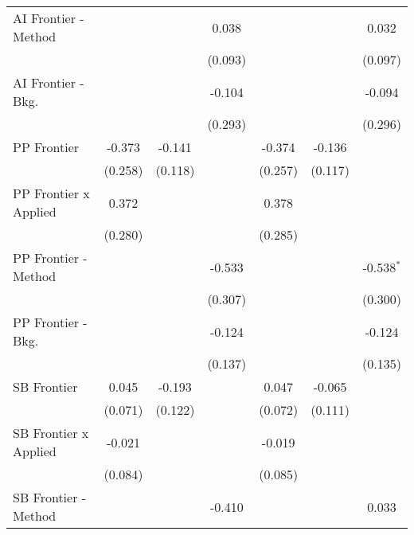\begin{tabular}{lcccccc}
   AI Frontier - Method         &                &         & 0.038         &                &         & 0.032\\   
                                &                &         & (0.093)       &                &         & (0.097)\\   
   AI Frontier - Bkg.           &                &         & -0.104        &                &         & -0.094\\   
                                &                &         & (0.293)       &                &         & (0.296)\\   
   PP Frontier                  & -0.373         & -0.141  &               & -0.374         & -0.136  &   \\   
                                & (0.258)        & (0.118) &               & (0.257)        & (0.117) &   \\   
   PP Frontier x Applied        & 0.372          &         &               & 0.378          &         &   \\   
                                & (0.280)        &         &               & (0.285)        &         &   \\   
   PP Frontier - Method         &                &         & -0.533        &                &         & -0.538$^{*}$\\   
                                &                &         & (0.307)       &                &         & (0.300)\\   
   PP Frontier - Bkg.           &                &         & -0.124        &                &         & -0.124\\   
                                &                &         & (0.137)       &                &         & (0.135)\\   
   SB Frontier                  & 0.045          & -0.193  &               & 0.047          & -0.065  &   \\   
                                & (0.071)        & (0.122) &               & (0.072)        & (0.111) &   \\   
   SB Frontier x Applied        & -0.021         &         &               & -0.019         &         &   \\   
                                & (0.084)        &         &               & (0.085)        &         &   \\   
   SB Frontier - Method         &                &         & -0.410        &                &         & 0.033\\   

\end{tabular}
